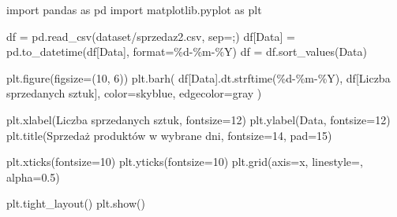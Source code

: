 \documentclass[
  polish,
  letterpaper,
  DIV=11,
  numbers=noendperiod]{scrreprt}
\newenvironment{Shaded}{\begin{snugshade}}{\end{snugshade}}
\newcommand{\BuiltInTok}[1]{\textcolor[rgb]{0.00,0.23,0.31}{#1}}
\newcommand{\DecValTok}[1]{\textcolor[rgb]{0.68,0.00,0.00}{#1}}
\newcommand{\FloatTok}[1]{\textcolor[rgb]{0.68,0.00,0.00}{#1}}
\newcommand{\ImportTok}[1]{\textcolor[rgb]{0.00,0.46,0.62}{#1}}
\newcommand{\NormalTok}[1]{\textcolor[rgb]{0.00,0.23,0.31}{#1}}
\newcommand{\OperatorTok}[1]{\textcolor[rgb]{0.37,0.37,0.37}{#1}}
\newcommand{\SpecialCharTok}[1]{\textcolor[rgb]{0.37,0.37,0.37}{#1}}
\newcommand{\StringTok}[1]{\textcolor[rgb]{0.13,0.47,0.30}{#1}}
\begin{document}
\begin{Shaded}
\begin{Highlighting}[]
\ImportTok{import}\NormalTok{ pandas }\ImportTok{as}\NormalTok{ pd}
\ImportTok{import}\NormalTok{ matplotlib.pyplot }\ImportTok{as}\NormalTok{ plt}

\NormalTok{df }\OperatorTok{=}\NormalTok{ pd.read\_csv(}\StringTok{\textquotesingle{}dataset/sprzedaz2.csv\textquotesingle{}}\NormalTok{, sep}\OperatorTok{=}\StringTok{\textquotesingle{};\textquotesingle{}}\NormalTok{)}
\NormalTok{df[}\StringTok{\textquotesingle{}Data\textquotesingle{}}\NormalTok{] }\OperatorTok{=}\NormalTok{ pd.to\_datetime(df[}\StringTok{\textquotesingle{}Data\textquotesingle{}}\NormalTok{], }\BuiltInTok{format}\OperatorTok{=}\StringTok{\textquotesingle{}}\SpecialCharTok{\%d}\StringTok{{-}\%m{-}\%Y\textquotesingle{}}\NormalTok{)}
\NormalTok{df }\OperatorTok{=}\NormalTok{ df.sort\_values(}\StringTok{\textquotesingle{}Data\textquotesingle{}}\NormalTok{)}

\NormalTok{plt.figure(figsize}\OperatorTok{=}\NormalTok{(}\DecValTok{10}\NormalTok{, }\DecValTok{6}\NormalTok{))}
\NormalTok{plt.barh(}
\NormalTok{    df[}\StringTok{\textquotesingle{}Data\textquotesingle{}}\NormalTok{].dt.strftime(}\StringTok{\textquotesingle{}}\SpecialCharTok{\%d}\StringTok{{-}\%m{-}\%Y\textquotesingle{}}\NormalTok{),}
\NormalTok{    df[}\StringTok{\textquotesingle{}Liczba sprzedanych sztuk\textquotesingle{}}\NormalTok{],}
\NormalTok{    color}\OperatorTok{=}\StringTok{\textquotesingle{}skyblue\textquotesingle{}}\NormalTok{,}
\NormalTok{    edgecolor}\OperatorTok{=}\StringTok{\textquotesingle{}gray\textquotesingle{}}
\NormalTok{)}

\NormalTok{plt.xlabel(}\StringTok{\textquotesingle{}Liczba sprzedanych sztuk\textquotesingle{}}\NormalTok{, fontsize}\OperatorTok{=}\DecValTok{12}\NormalTok{)}
\NormalTok{plt.ylabel(}\StringTok{\textquotesingle{}Data\textquotesingle{}}\NormalTok{, fontsize}\OperatorTok{=}\DecValTok{12}\NormalTok{)}
\NormalTok{plt.title(}\StringTok{\textquotesingle{}Sprzedaż produktów w wybrane dni\textquotesingle{}}\NormalTok{, fontsize}\OperatorTok{=}\DecValTok{14}\NormalTok{, pad}\OperatorTok{=}\DecValTok{15}\NormalTok{)}

\NormalTok{plt.xticks(fontsize}\OperatorTok{=}\DecValTok{10}\NormalTok{)}
\NormalTok{plt.yticks(fontsize}\OperatorTok{=}\DecValTok{10}\NormalTok{)}
\NormalTok{plt.grid(axis}\OperatorTok{=}\StringTok{\textquotesingle{}x\textquotesingle{}}\NormalTok{, linestyle}\OperatorTok{=}\StringTok{\textquotesingle{}{-}{-}\textquotesingle{}}\NormalTok{, alpha}\OperatorTok{=}\FloatTok{0.5}\NormalTok{)}

\NormalTok{plt.tight\_layout()}
\NormalTok{plt.show()}
\end{Highlighting}
\end{Shaded}
\end{document}
